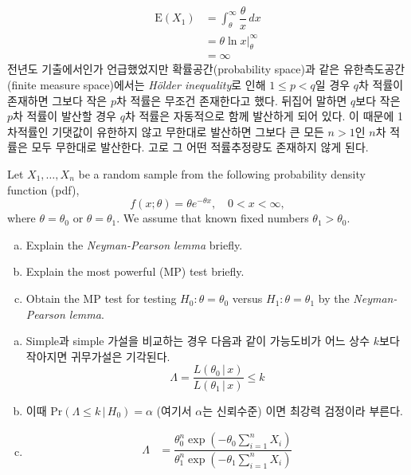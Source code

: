\documentclass[answers]{exam}
\begin{document}
\begin{questions}
\begin{solution}
\begin{enumerate}[(a)]
\begin{align}
    			\mathrm{E}\left(X_{1}\right) &= \int_{\theta}^{\infty} \dfrac{\theta}{x}\,dx\\
    			&= \theta\ln x\Big|_{\theta}^{\infty}\\
    			&=\infty
    		\end{align}
    		전년도 기출에서인가 언급했었지만 확률공간(probability space)과 같은 유한측도공간(finite measure space)에서는 \emph{Hölder inequality}로 인해 $1\leq p<q$일 경우 $q$차 적률이 존재하면 그보다 작은 $p$차 적률은 무조건 존재한다고 했다. 뒤집어 말하면 $q$보다 작은 $p$차 적률이 발산할 경우 $q$차 적률은 자동적으로 함께 발산하게 되어 있다. 이 때문에 1차적률인 기댓값이 유한하지 않고 무한대로 발산하면 그보다 큰 모든 $n>1$인 $n$차 적률은 모두 무한대로 발산한다. 고로 그 어떤 적률추정량도 존재하지 않게 된다.
    	\end{enumerate}
    \end{solution}
    \question
    Let $X_{1},\ldots, X_{n}$ be a random sample from the following probability density function (pdf),
    $$
      f\left(x;\theta\right)=\theta e^{-\theta x}, \quad 0<x<\infty,
    $$
    where $\theta=\theta_{0}$ or $\theta=\theta_{1}$. We assume that known fixed numbers $\theta_{1}>\theta_{0}$.
    \begin{enumerate}[(a)]
      \item Explain the \emph{Neyman-Pearson lemma} briefly.
      \item Explain the most powerful (MP) test briefly.
      \item Obtain the MP test for testing $H_{0}:\theta=\theta_{0}$ versus $H_{1}:\theta=\theta_{1}$ by the \emph{Neyman-Pearson lemma}.
    \end{enumerate}
    \begin{solution}
    	\begin{enumerate}[(a)]
    		\item Simple과 simple 가설을 비교하는 경우 다음과 같이 가능도비가 어느 상수 $k$보다 작아지면 귀무가설은 기각된다.
    		\begin{equation}
    			\Lambda = \dfrac{L\left(\theta_{0}\,|\,x\right)}{L\left(\theta_{1}\,|\,x\right)}\leq k
    		\end{equation}
    		\item 이때 $\mathrm{Pr}\left(\Lambda\leq k\,|\,H_{0}\right)=\alpha$ (여기서 $\alpha$는 신뢰수준) 이면 최강력 검정이라 부른다.
    		\item 
    		\begin{align}
    			\Lambda &= \dfrac{\theta_{0}^{n}\exp\left(-\theta_{0}\sum_{i=1}^{n}X_{i}\right)}{\theta_{1}^{n}\exp\left(-\theta_{1}\sum_{i=1}^{n}X_{i}\right)}\\

\end{align}
\end{enumerate}
\end{solution}
\end{questions}
\end{document}
